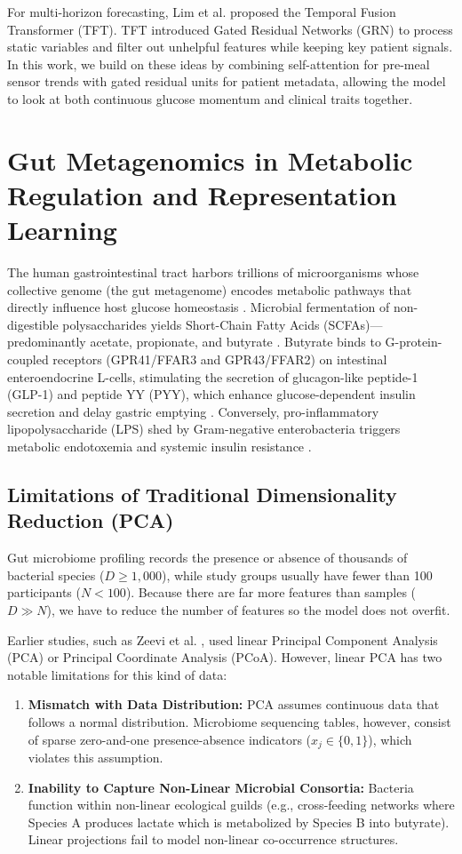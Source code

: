 For multi-horizon forecasting, Lim et al. \cite{lim2021temporal} proposed the Temporal Fusion Transformer (TFT). TFT introduced Gated Residual Networks (GRN) to process static variables and filter out unhelpful features while keeping key patient signals. In this work, we build on these ideas by combining self-attention for pre-meal sensor trends with gated residual units for patient metadata, allowing the model to look at both continuous glucose momentum and clinical traits together.

\section{Gut Metagenomics in Metabolic Regulation and Representation Learning}
The human gastrointestinal tract harbors trillions of microorganisms whose collective genome (the gut metagenome) encodes metabolic pathways that directly influence host glucose homeostasis \cite{turnbaugh2006obesity}. Microbial fermentation of non-digestible polysaccharides yields Short-Chain Fatty Acids (SCFAs)—predominantly acetate, propionate, and butyrate \cite{canfora2015short}. Butyrate binds to G-protein-coupled receptors (GPR41/FFAR3 and GPR43/FFAR2) on intestinal enteroendocrine L-cells, stimulating the secretion of glucagon-like peptide-1 (GLP-1) and peptide YY (PYY), which enhance glucose-dependent insulin secretion and delay gastric emptying \cite{canfora2015short}. Conversely, pro-inflammatory lipopolysaccharide (LPS) shed by Gram-negative enterobacteria triggers metabolic endotoxemia and systemic insulin resistance \cite{asnicar2021microbiome}.

\subsection{Limitations of Traditional Dimensionality Reduction (PCA)}
Gut microbiome profiling records the presence or absence of thousands of bacterial species ($D \ge 1,000$), while study groups usually have fewer than 100 participants ($N < 100$). Because there are far more features than samples ($D \gg N$), we have to reduce the number of features so the model does not overfit.

Earlier studies, such as Zeevi et al. \cite{zeevi2015personalized}, used linear Principal Component Analysis (PCA) or Principal Coordinate Analysis (PCoA). However, linear PCA has two notable limitations for this kind of data:
\begin{enumerate}
    \item \textbf{Mismatch with Data Distribution:} PCA assumes continuous data that follows a normal distribution. Microbiome sequencing tables, however, consist of sparse zero-and-one presence-absence indicators ($x_j \in \{0, 1\}$), which violates this assumption.
    \item \textbf{Inability to Capture Non-Linear Microbial Consortia:} Bacteria function within non-linear ecological guilds (e.g., cross-feeding networks where Species A produces lactate which is metabolized by Species B into butyrate). Linear projections fail to model non-linear co-occurrence structures.
\end{enumerate}

